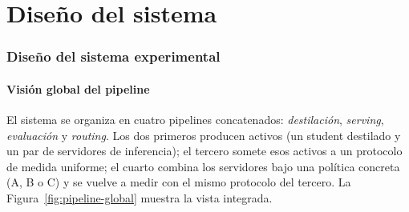 \part{Diseño del sistema}
\label{part:diseno-sistema}

\section{Diseño del sistema experimental}
\label{sec:diseno-sistema-exp}

\subsection{Visión global del pipeline}

El sistema se organiza en cuatro pipelines concatenados: \textit{destilación}, \textit{serving}, \textit{evaluación} y \textit{routing}. Los dos primeros producen activos (un student destilado y un par de servidores de inferencia); el tercero somete esos activos a un protocolo de medida uniforme; el cuarto combina los servidores bajo una política concreta (A, B o C) y se vuelve a medir con el mismo protocolo del tercero. La Figura~\ref{fig:pipeline-global} muestra la vista integrada.

